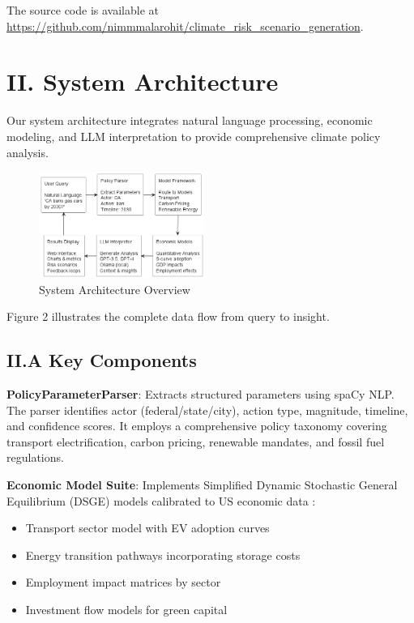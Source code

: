 \documentclass[10pt,twocolumn]{article}
\begin{document}
The source code is available at \url{https://github.com/nimmmalarohit/climate_risk_scenario_generation}.

\section{II. System Architecture}

Our system architecture integrates natural language processing, economic modeling, and LLM interpretation to provide comprehensive climate policy analysis.

\begin{figure}[!htb]
\centering
\includegraphics[width=0.48\textwidth]{high_level_architecture_simple.png}
\caption{System Architecture Overview}
\label{fig:architecture}
\end{figure}

Figure 2 illustrates the complete data flow from query to insight.

\subsection{II.A Key Components}

\textbf{PolicyParameterParser}: Extracts structured parameters using spaCy NLP. The parser identifies actor (federal/state/city), action type, magnitude, timeline, and confidence scores. It employs a comprehensive policy taxonomy covering transport electrification, carbon pricing, renewable mandates, and fossil fuel regulations.

\textbf{Economic Model Suite}: Implements Simplified Dynamic Stochastic General Equilibrium (DSGE) models calibrated to US economic data \citep{feridun2020climate}:
\begin{itemize}
\item Transport sector model with EV adoption curves
\item Energy transition pathways incorporating storage costs
\item Employment impact matrices by sector
\item Investment flow models for green capital
\end{itemize}
\end{document}
